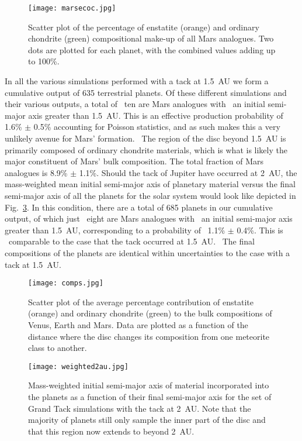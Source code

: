 \documentclass[preprint,5p,times,authoryear]{elsarticle}
\begin{document}
\begin{figure}[ht!]
\texttt{[image: marsecoc.jpg]}
\caption{Scatter plot of the percentage of enstatite (orange) and ordinary chondrite (green) compositional make-up of all Mars 
analogues. Two dots are plotted for each planet, with the combined values adding up to 100\%.}
\label{fig:ecoc}
\end{figure}

In all the various simulations performed with a tack at 1.5~AU we form a cumulative output of 635 terrestrial planets. Of these 
different simulations and their various outputs, a total of {\ ten} are Mars analogues with {\ an initial semi-major 
axis greater than 1.5~AU}. This is an effective production probability of 1.6\% $\pm$ 0.5\% accounting for Poisson statistics, and as 
such makes this a very unlikely avenue for Mars' formation. {\ The region of the disc beyond 1.5~AU is primarily composed of 
ordinary chondrite materials, which is what is likely the major constituent of Mars' bulk composition.} The total fraction of Mars 
analogues is 8.9\% $\pm$ 1.1\%. Should the tack of Jupiter have occurred at 2~AU, the mass-weighted mean initial semi-major 
axis of planetary material versus the final semi-major axis of all the planets for the solar system would look like depicted in 
Fig.~\ref{fig:sumgt20}. In this condition, there are a total of 685 planets in our cumulative output, of which just {\ eight} are 
Mars analogues with {\ an initial semi-major axis greater than 1.5~AU}, corresponding to a probability of {\ 1.1\% $\pm$ 
0.4\%.} This is {\ comparable to} the case that the tack occurred at 1.5~AU. {\ The final compositions of the planets are 
identical within uncertainties to the case with a tack at 1.5~AU.} \\

\begin{figure}[ht!]
\texttt{[image: comps.jpg]}
\caption{Scatter plot of the average percentage contribution of enstatite (orange) and ordinary chondrite (green) to the bulk 
compositions of Venus, Earth and Mars. Data are plotted as a function of the distance where the disc changes its composition from one 
meteorite class to another.}
\label{fig:comps}
\end{figure}


\begin{figure}[ht!]
\texttt{[image: weighted2au.jpg]}
\caption{Mass-weighted initial semi-major axis of material incorporated into the planets as a function of their final semi-major axis 
for the set of Grand Tack simulations with the tack at 2~AU. Note that the majority of planets still only sample the inner part of the 
disc and that this region now extends to beyond 2~AU.}
\label{fig:sumgt20}
\end{figure}
\end{document}
